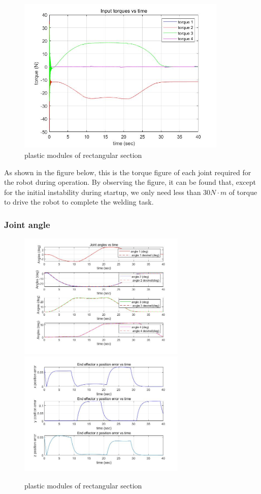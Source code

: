 \begin{figure}[htbp]
    \centering
    \includegraphics[width=10cm]{./fig/3.jpg}
    \caption{plastic modules of rectangular section}
    \label{f1}
\end{figure}

As shown in the figure below, this is the torque figure of each joint required for the robot during operation. By observing the figure, it can be found that, except for the initial instability during startup, we only need less than $30N\cdot m$ of torque to drive the robot to complete the welding task.

\subsubsection*{Joint angle}

\begin{figure}[htbp]
    \centering
    \includegraphics[width=8cm]{./fig/4.jpg}
    \includegraphics[width=8cm]{./fig/6.jpg}
    \caption{plastic modules of rectangular section}
    \label{f1}
\end{figure}

